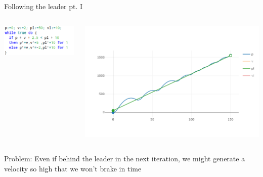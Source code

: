 \documentclass{beamer}
\begin{document}
\begin{frame}{Following the leader pt. I}
  \begin{minipage}[0.3\textheight]{\textwidth}
  \begin{columns}[c]
  \begin{column}{0.45\textwidth}
   \hspace{0.3cm}
   \includegraphics[scale=0.38]{./images/fl1.png}
  \end{column}
  \begin{column}{1\textwidth}
    \includegraphics[scale=0.3]{./images/fl_plot.png}
  \end{column}
  \end{columns}
  \end{minipage}

  \pause
  Problem: Even if behind the leader in the next iteration, we might
  generate a velocity so high that we won't brake in time
\end{frame}
\end{document}

